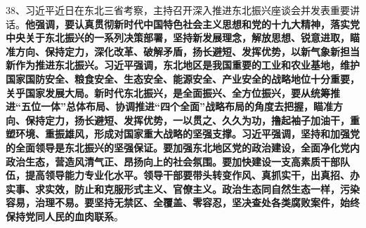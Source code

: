 38、习近平近日在东北三省考察，主持召开深入推进东北振兴座谈会并发表重要讲话。{\textbf{他强调，要认真贯彻新时代中国特色社会主义思想和党的十九大精神，落实党中央关于东北振兴的一系列决策部署，坚持新发展理念，解放思想、锐意进取，瞄准方向、保持定力，深化改革、破解矛盾，扬长避短、发挥优势，以新气象新担当新作为推进东北振兴。习近平强调，东北地区是我国重要的工业和农业基地，维护国家国防安全、粮食安全、生态安全、能源安全、产业安全的战略地位十分重要，关乎国家发展大局。新时代东北振兴，是全面振兴、全方位振兴，要从统筹推进``五位一体''总体布局、协调推进``四个全面''战略布局的角度去把握，瞄准方向、保持定力，扬长避短、发挥优势，一以贯之、久久为功，撸起袖子加油干，重塑环境、重振雄风，形成对国家重大战略的坚强支撑。习近平强调，坚持和加强党的全面领导是东北振兴的坚强保证。要加强东北地区党的政治建设，全面净化党内政治生态，营造风清气正、昂扬向上的社会氛围。要加快建设一支高素质干部队伍，提高领导能力专业化水平。领导干部要带头转变作风、真抓实干，出真招、办实事、求实效，防止和克服形式主义、官僚主义。政治生态同自然生态一样，污染容易，治理不易。要坚持无禁区、全覆盖、零容忍，坚决查处各类腐败案件，始终保持党同人民的血肉联系}}。
